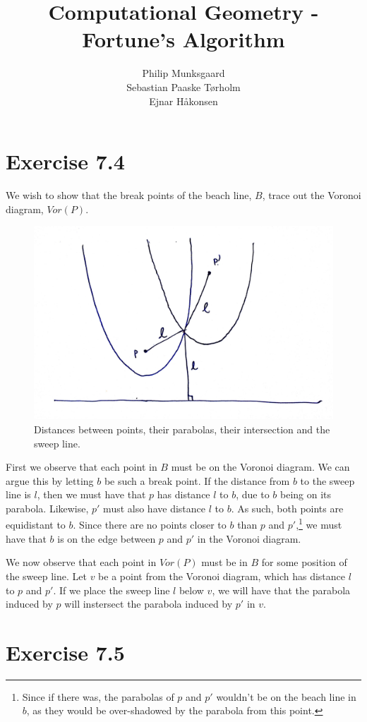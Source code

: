 \documentclass[11pt,a4paper]{article}
\title{Computational Geometry - Fortune's Algorithm}
\author{Philip Munksgaard \\ Sebastian Paaske Tørholm \\ Ejnar Håkonsen}
\begin{document}
\maketitle

\section{Exercise 7.4}
We wish to show that the break points of the beach line, $B$, trace out the Voronoi diagram, $Vor(P)$.

\begin{figure}[h!]
    \centering
    \includegraphics[width=.7\textwidth]{ex74-diagram.jpg}
    \caption{Distances between points, their parabolas, their intersection and the sweep line.}
    \label{ex74:dist}
\end{figure}

First we observe that each point in $B$ must be on the Voronoi diagram. We can
argue this by letting $b$ be such a break point. If the distance from $b$ to
the sweep line is $l$, then we must have that $p$ has distance $l$ to $b$, due
to $b$ being on its parabola. Likewise, $p'$ must also have distance $l$ to
$b$. As such, both points are equidistant to $b$. Since there are no
points closer to $b$ than $p$ and $p'$,\footnote{Since if there was, the
parabolas of $p$ and $p'$ wouldn't be on the beach line in $b$, as they would
be over-shadowed by the parabola from this point.}
we must have that $b$ is on the edge between $p$ and $p'$ in the Voronoi diagram.

We now observe that each point in $Vor(P)$ must be in $B$ for some position
of the sweep line. Let $v$ be a point from the Voronoi diagram, which has
distance $l$ to $p$ and $p'$. If we place the sweep line $l$ below $v$, we
will have that the parabola induced by $p$ will instersect the parabola
induced by $p'$ in $v$.

\section{Exercise 7.5}
\end{document}
